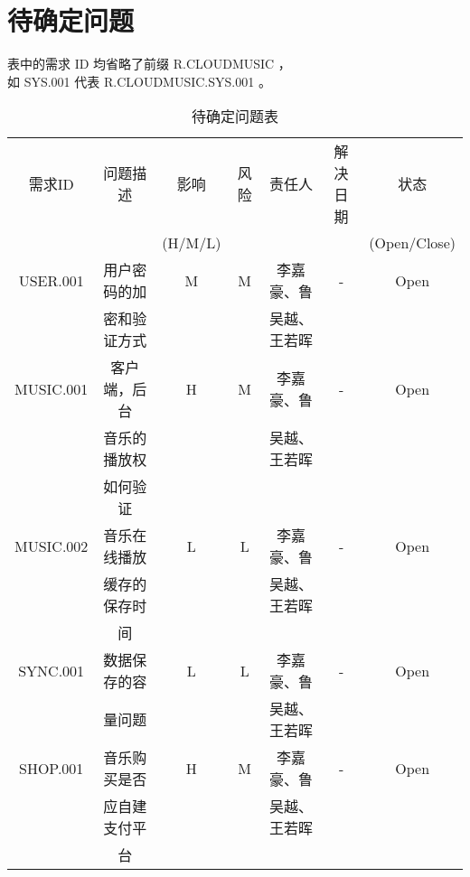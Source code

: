\chapter{待确定问题}
表中的需求 ID 均省略了前缀 R.CLOUDMUSIC ，\\
    如 SYS.001 代表 R.CLOUDMUSIC.SYS.001 。
\begin{table}[htbp]
\centering
\caption{待确定问题表} \label{tab:tbd_problems}
\begin{tabular}{|c|c|c|c|c|c|c|}
    \hline
    需求ID & 问题描述 & 影响    & 风险 & 责任人 & 解决日期 & 状态 \\
           &          & (H/M/L) &      &        &          & (Open/Close) \\
    \hline
    USER.001 & 用户密码的加 & M & M & 李嘉豪、鲁    & - & Open\\
             & 密和验证方式 &   &   & 吴越、王若晖  &   &\\
    \hline
    MUSIC.001 & 客户端，后台    & H & M & 李嘉豪、鲁    & - & Open\\
              & 音乐的播放权    &   &   & 吴越、王若晖  &   &\\
              & 如何验证        &   &   &               &   &\\
    \hline
    MUSIC.002 & 音乐在线播放    & L & L & 李嘉豪、鲁    & - & Open\\
              & 缓存的保存时    &   &   & 吴越、王若晖  &   &   \\
              & 间              &   &   &               &   &   \\
    \hline
    SYNC.001 & 数据保存的容 & L & L & 李嘉豪、鲁    & - & Open\\
             & 量问题       &   &   & 吴越、王若晖  &   & \\
    \hline
    SHOP.001 & 音乐购买是否 & H & M & 李嘉豪、鲁    & - & Open\\
             & 应自建支付平 &   &   & 吴越、王若晖  &   &\\
             & 台           &   &   &               &   &\\
    \hline
\end{tabular}
\end{table}